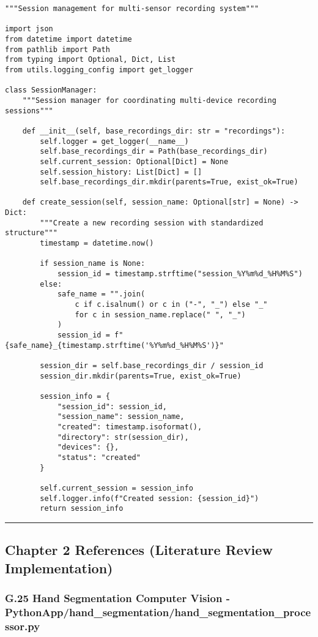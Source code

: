 \documentclass[12pt,a4paper]{article}
\begin{document}
\begin{verbatim}
"""Session management for multi-sensor recording system"""

import json
from datetime import datetime
from pathlib import Path
from typing import Optional, Dict, List
from utils.logging_config import get_logger

class SessionManager:
    """Session manager for coordinating multi-device recording sessions"""
    
    def __init__(self, base_recordings_dir: str = "recordings"):
        self.logger = get_logger(__name__)
        self.base_recordings_dir = Path(base_recordings_dir)
        self.current_session: Optional[Dict] = None
        self.session_history: List[Dict] = []
        self.base_recordings_dir.mkdir(parents=True, exist_ok=True)
    
    def create_session(self, session_name: Optional[str] = None) -> Dict:
        """Create a new recording session with standardized structure"""
        timestamp = datetime.now()
        
        if session_name is None:
            session_id = timestamp.strftime("session_%Y%m%d_%H%M%S")
        else:
            safe_name = "".join(
                c if c.isalnum() or c in ("-", "_") else "_" 
                for c in session_name.replace(" ", "_")
            )
            session_id = f"{safe_name}_{timestamp.strftime('%Y%m%d_%H%M%S')}"
        
        session_dir = self.base_recordings_dir / session_id
        session_dir.mkdir(parents=True, exist_ok=True)
        
        session_info = {
            "session_id": session_id,
            "session_name": session_name,
            "created": timestamp.isoformat(),
            "directory": str(session_dir),
            "devices": {},
            "status": "created"
        }
        
        self.current_session = session_info
        self.logger.info(f"Created session: {session_id}")
        return session_info
\end{verbatim}

\hrule

\subsection{Chapter 2 References (Literature Review Implementation)}

\subsubsection{G.25 Hand Segmentation Computer Vision - PythonApp/hand_segmentation/hand_segmentation_processor.py}
\end{document}

